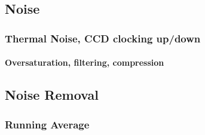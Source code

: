 \documentclass[11pt]{article} %
\begin{document}
\subsection{Noise}
\subsubsection{Thermal Noise, CCD clocking up/down}
\paragraph{Oversaturation, filtering, compression}

\subsection {Noise Removal}
\subsubsection{Running Average}
\end{document}
